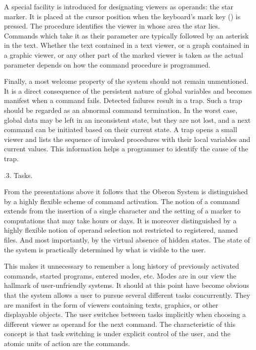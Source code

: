 A special facility is introduced for designating viewers as operands:
the star marker. It is placed at the cursor position when the
keyboard's mark key () is pressed. The procedure
 identifies the viewer in whose area the star
lies. Commands which take it as their parameter are typically followed
by an asterisk in the text. Whether the text contained in a text
viewer, or a graph contained in a graphic viewer, or any other part of
the marked viewer is taken as the actual parameter depends on how the
command procedure is programmed.

Finally, a most welcome property of the system should not remain
unmentioned. It is a direct consequence of the persistent nature of
global variables and becomes manifest when a command fails. Detected
failures result in a trap. Such a trap should be regarded as an
abnormal command termination. In the worst case, global data may be
left in an inconsistent state, but they are not lost, and a next
command can be initiated based on their current state. A trap opens a
small viewer and lists the sequence of invoked procedures with their
local variables and current values. This information helps a
programmer to identify the cause of the trap.

.3. Tasks.

From the presentations above it follows that the Oberon System is
distinguished by a highly flexible scheme of command activation. The
notion of a command extends from the insertion of a single character
and the setting of a marker to computations that may take hours or
days. It is moreover distinguished by a highly flexible notion of
operand selection not restricted to registered, named files. And most
importantly, by the virtual absence of hidden states. The state of the
system is practically determined by what is visible to the user.

This makes it unnecessary to remember a long history of previously
activated commands, started programs, entered modes, etc. Modes are in
our view the hallmark of user-unfriendly systems. It should at this
point have become obvious that the system allows a user to pursue
several different tasks concurrently. They are manifest in the form of
viewers containing texts, graphics, or other displayable objects. The
user switches between tasks implicitly when choosing a different
viewer as operand for the next command. The characteristic of this
concept is that task switching is under explicit control of the user,
and the atomic units of action are the commands.

